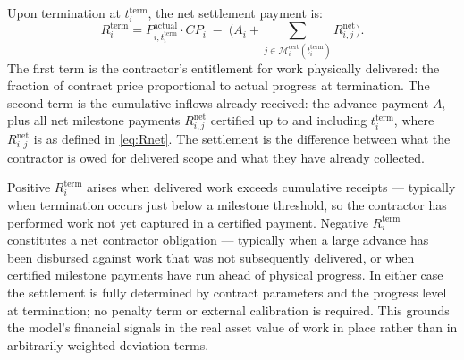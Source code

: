 Upon termination at $t_i^{\mathrm{term}}$, the net settlement payment
is:
\begin{equation}
  R_i^{\mathrm{term}}
    = P_{i,t_i^{\mathrm{term}}}^{\mathrm{actual}} \cdot CP_i
      \;-\;
      \Biggl(
        A_i
        + \sum_{j \in \mathcal{M}_i^{\mathrm{cert}}(t_i^{\mathrm{term}})}
            R_{i,j}^{\mathrm{net}}
      \Biggr).
  \label{eq:term_settlement}
\end{equation}
The first term is the contractor's entitlement for work physically
delivered: the fraction of contract price proportional to actual
progress at termination. The second term is the cumulative inflows
already received: the advance payment $A_i$ plus all net milestone
payments $R_{i,j}^{\mathrm{net}}$ certified up to and including
$t_i^{\mathrm{term}}$, where $R_{i,j}^{\mathrm{net}}$ is as defined
in \eqref{eq:Rnet}. The settlement is the difference between what the
contractor is owed for delivered scope and what they have already
collected.

Positive $R_i^{\mathrm{term}}$ arises when delivered work exceeds
cumulative receipts --- typically when termination occurs just below a
milestone threshold, so the contractor has performed work not yet
captured in a certified payment. Negative $R_i^{\mathrm{term}}$
constitutes a net contractor obligation --- typically when a large
advance has been disbursed against work that was not subsequently
delivered, or when certified milestone payments have run ahead of
physical progress. In either case the settlement is fully determined
by contract parameters and the progress level at termination; no
penalty term or external calibration is required. This grounds the
model's financial signals in the real asset value of work in place
\citep{Dixit1994} rather than in arbitrarily weighted deviation terms.

